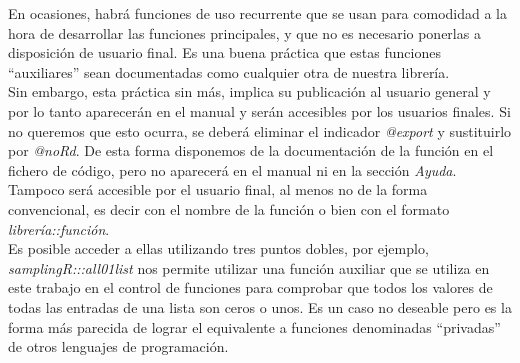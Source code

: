 En ocasiones, habrá funciones de uso recurrente que se usan para comodidad a la hora de desarrollar las funciones principales, y que no es necesario ponerlas a disposición de usuario final. Es una buena práctica que estas funciones ``auxiliares'' sean documentadas como cualquier otra de nuestra librería.\\

Sin embargo, esta práctica sin más, implica su publicación al usuario general y por lo tanto aparecerán en el manual y serán accesibles por los usuarios finales. Si no queremos que esto ocurra, se deberá eliminar el indicador \textit{@export} y sustituirlo por \textit{@noRd}. De esta forma disponemos de la documentación de la función en el fichero de código, pero no aparecerá en el manual ni en la sección \textit{Ayuda}. Tampoco será accesible por el usuario final, al menos no de la forma convencional, es decir con el nombre de la función o bien con el formato \textit{librería::función}.\\

Es posible acceder a ellas utilizando tres puntos dobles, por ejemplo, \textit{samplingR:::all01list} nos permite utilizar una función auxiliar que se utiliza en este trabajo en el control de funciones para comprobar que todos los valores de todas las entradas de una lista son ceros o unos. Es un caso no deseable pero es la forma más parecida de lograr el equivalente a funciones denominadas ``privadas'' de otros lenguajes de programación.\\

